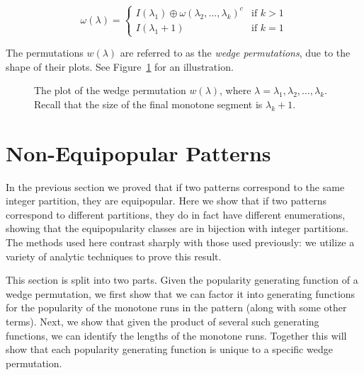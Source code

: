 \documentclass[10pt]{article}
\theoremstyle{definition}
\numberwithin{equation}{section}
\numberwithin{figure}{section}
\begin{document}
\[
\omega(\lambda) = 
\begin{cases}
I(\lambda_1) \oplus \omega(\lambda_2, \dots, \lambda_k)^c & \text{if $k > 1$} \\
I(\lambda_1+1) & \text{if $k = 1$}
\end{cases}
\]

The permutations $w(\lambda)$ are referred to as the \emph{wedge permutations}, due to the shape of their plots. See Figure~\ref{fig:wedge} for an illustration. 
  
\begin{figure}
  \centering
  \caption{The plot of the wedge permutation $w(\lambda)$, where $\lambda = \lambda_1, \lambda_2, \dots, \lambda_k$. Recall that the size of the final monotone segment is $\lambda_k + 1$.} \label{fig:wedge}
\end{figure}

\section{Non-Equipopular Patterns}
\label{sec:nonequi}

In the previous section we proved that if two patterns correspond to the same integer partition, they are equipopular. Here we show that if two patterns correspond to different partitions, they do in fact have different enumerations, showing that the equipopularity classes are in bijection with integer partitions. The methods used here contrast sharply with those used previously: we utilize a variety of analytic techniques to prove this result. 

This section is split into two parts. Given the popularity generating function of a wedge permutation, we first show that we can factor it into generating functions for the popularity of the monotone runs in the pattern (along with some other terms). Next, we show that given the product of several such generating functions, we can identify the lengths of the monotone runs. Together this will show that each popularity generating function is unique to a specific wedge permutation.
\end{document}
